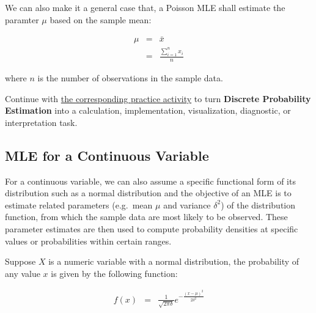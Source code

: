 \documentclass[
  letterpaper,
]{scrbook}
\begin{document}
We can also make it a general case that, a Poisson MLE shall estimate
the paramter \(\mu\) based on the sample mean:

\[\begin{aligned}
\mu & = & \bar{x} \\
    & = & \frac{\sum_{i=1}^{n} x_i}{n}
\end{aligned}\]

where \(n\) is the number of observations in the sample data.

\begin{tcolorbox}[enhanced jigsaw, arc=.35mm, bottomrule=.15mm, bottomtitle=1mm, breakable, colback=white, colbacktitle=quarto-callout-tip-color!10!white, colframe=quarto-callout-tip-color-frame, coltitle=black, left=2mm, leftrule=.75mm, opacityback=0, opacitybacktitle=0.6, rightrule=.15mm, title=\textcolor{quarto-callout-tip-color}{\faLightbulb}\hspace{0.5em}{Put it into practice}, titlerule=0mm, toprule=.15mm, toptitle=1mm]

Continue with \hyperref[sec-pr-04-discrete-probability-estimation]{the
corresponding practice activity} to turn \textbf{Discrete Probability
Estimation} into a calculation, implementation, visualization,
diagnostic, or interpretation task.

\end{tcolorbox}

\subsection{MLE for a Continuous
Variable}\label{mle-for-a-continuous-variable}

For a continuous variable, we can also assume a specific functional form
of its distribution such as a normal distribution and the objective of
an MLE is to estimate related parameters (e.g.~mean \(\mu\) and variance
\(\delta^2\)) of the distribution function, from which the sample data
are most likely to be observed. These parameter estimates are then used
to compute probability densities at specific values or probabilities
within certain ranges.

Suppose \(X\) is a numeric variable with a normal distribution, the
probability of any value \(x\) is given by the following function:

\[\begin{aligned}
  f(x) & = & \frac{1}{\sqrt{2\pi\delta}} e^{-\frac{(x-\mu)^2}{2\delta^2}}
\end{aligned}\]
\end{document}
